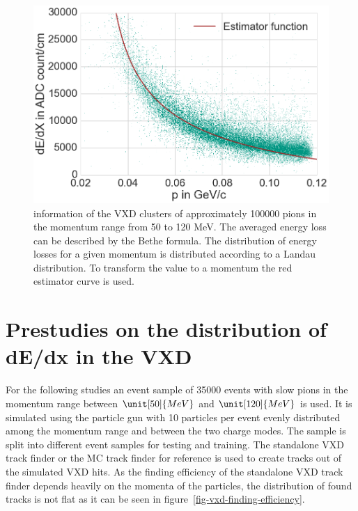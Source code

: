 \begin{figure}
 \centering
 \includegraphics[width=0.8\linewidth]{figures/vxd/dedxWithEstimator.png}
 \caption[\dedx information of the VXD clusters.]{\dedx information of the VXD clusters of approximately 100000 pions in the momentum range from 50 to 120 MeV. The averaged energy loss can be described by the Bethe formula. The distribution of energy losses for a given momentum is distributed according to a Landau distribution. To transform the \dedx value to a momentum the red estimator curve is used.}
 \label{fig-dedx-over-p}
\end{figure}


\section{Prestudies on the distribution of dE/dx in the VXD}

For the following studies an event sample of 35000 events with slow pions in the momentum range between $\unit[50]{MeV}$ and $\unit[120]{MeV}$ is used. It is simulated using the particle gun with 10 particles per event evenly distributed among the momentum range and between the two charge modes. The sample is split into different event samples for testing and training. The standalone VXD track finder or the MC track finder for reference is used to create tracks out of the simulated VXD hits. As the finding efficiency of the standalone VXD track finder depends heavily on the momenta of the particles, the distribution of found tracks is not flat as it can be seen in figure~\ref{fig-vxd-finding-efficiency}. 

